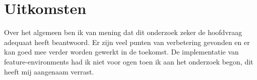 \section{Uitkomsten}
Over het algemeen ben ik van mening dat dit onderzoek zeker de hoofdvraag adequaat heeft beantwoord. Er zijn veel punten van verbetering gevonden en er kan goed mee verder worden gewerkt in de toekomst. De implementatie van feature-environments had ik niet voor ogen toen ik aan het onderzoek begon, dit heeft mij aangenaam verrast.
